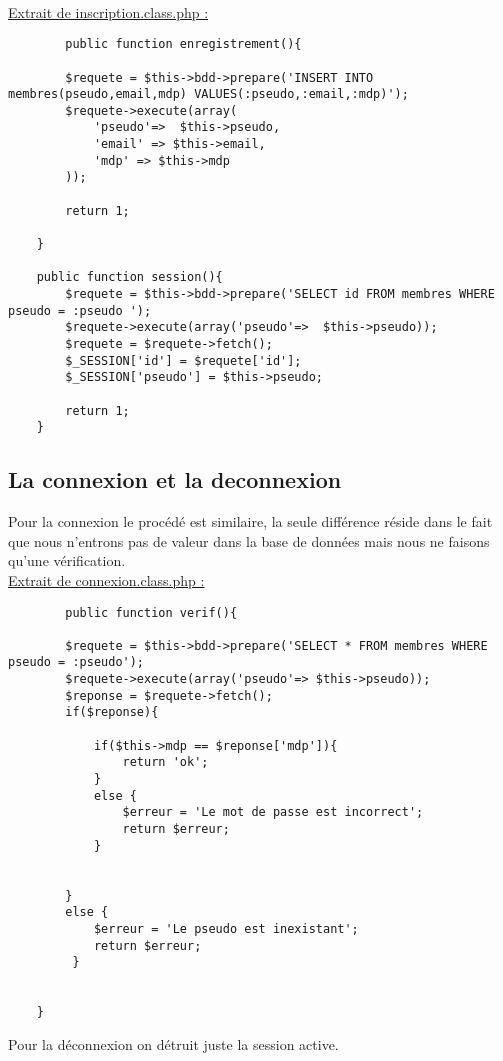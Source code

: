 \documentclass{article}
\begin{document}
    \\ \underline{Extrait de inscription.class.php :}
    \begin{lstlisting}
        public function enregistrement(){
        
        $requete = $this->bdd->prepare('INSERT INTO membres(pseudo,email,mdp) VALUES(:pseudo,:email,:mdp)');
        $requete->execute(array(
            'pseudo'=>  $this->pseudo,
            'email' => $this->email,
            'mdp' => $this->mdp 
        ));
        
        return 1; 
       
    }
    
    public function session(){
        $requete = $this->bdd->prepare('SELECT id FROM membres WHERE pseudo = :pseudo ');
        $requete->execute(array('pseudo'=>  $this->pseudo));
        $requete = $requete->fetch();
        $_SESSION['id'] = $requete['id'];
        $_SESSION['pseudo'] = $this->pseudo;
        
        return 1;
    }
    \end{lstlisting}
    \newpage
    \subsection{La connexion et la deconnexion}
    Pour la connexion le procédé est similaire, la seule différence réside dans le fait que nous n'entrons pas de valeur dans la base de données mais nous ne faisons qu'une vérification. \\
    \underline{Extrait de connexion.class.php :}
    \begin{lstlisting}
        public function verif(){
        
        $requete = $this->bdd->prepare('SELECT * FROM membres WHERE pseudo = :pseudo');
        $requete->execute(array('pseudo'=> $this->pseudo));
        $reponse = $requete->fetch();
        if($reponse){
            
            if($this->mdp == $reponse['mdp']){
                return 'ok';
            }
            else {
                $erreur = 'Le mot de passe est incorrect';
                return $erreur;
            }
            
            
        }
        else {
            $erreur = 'Le pseudo est inexistant';
            return $erreur;
         }
        
        
    }
    \end{lstlisting} 
    Pour la déconnexion on détruit juste la session active. 
    \newpage
\end{document}
